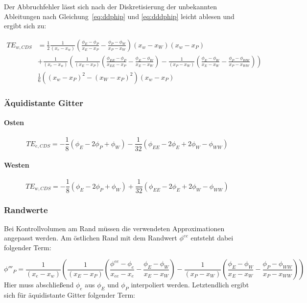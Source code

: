 \documentclass[11pt, ngerman,colorback,accentcolor=tud2d]{tudreport}
\begin{document}
Der Abbruchfehler lässt sich nach der Diskretisierung der unbekannten Ableitungen nach Gleichung~\eqref{eq:ddphip}
und \eqref{eq:dddphip} leicht ablesen und ergibt sich zu:

\begin{align}
  TE_{w, CDS} &=  \frac{1}{2} \frac{1}{(x_e-x_w)} \left({\frac{\phi_E-\phi_P}{x_E-x_P}
  - \frac{\phi_P-\phi_W}{x_P-x_W} }\right) \left({x_w-x_W}\right)(x_w-x_P)  \nonumber\\
  &+ \frac{1}{(x_e-x_w)} \left({
  \frac{1}{(x_E-x_P)} \left({\frac{\phi_{EE}-\phi_P}{x_{EE}-x_P}- \frac{\phi_E-\phi_W}{x_E-x_W} }\right)-
  \frac{1}{(x_P-x_W)} \left({\frac{\phi_E-\phi_W}{x_E-x_W} - \frac{\phi_P-\phi_{WW}}{x_P-x_{WW}} }\right)
  }\right) \nonumber\\
  &\frac{1}{6}  \left({(x_w-x_P)^2-(x_W-x_P)^2}\right)(x_w-x_P)
\end{align}

\subsubsection{Äquidistante Gitter}

\paragraph{Osten}

\begin{equation}
  TE_{e, CDS} = -\frac{1}{8} (\phi_E-2\phi_P+\phi_W) - \frac{1}{32}
  (\phi_{EE} - 2\phi_E + 2\phi_W - \phi_{WW})
\end{equation}

\paragraph{Westen}

\begin{equation}
  TE_{w, CDS} = -\frac{1}{8} (\phi_E-2\phi_P+\phi_W) + \frac{1}{32}
  (\phi_{EE} - 2\phi_E + 2\phi_W - \phi_{WW})
\end{equation}

\subsubsection{Randwerte}

Bei Kontrollvolumen am Rand müssen die verwendeten Approximationen angepasst werden.
Am östlichen Rand mit dem Randwert $\phi^{ee}$ entsteht dabei folgender Term:

\begin{equation*}
  \phi'''_P = \frac{1}{(x_e-x_w)} \left({
      \frac{1}{(x_E-x_P)} \left({\frac{\phi^{ee}-\phi_e}{x_{ee}-x_e}- \frac{\phi_E-\phi_W}{x_E-x_W} }\right)-
  \frac{1}{(x_P-x_W)} \left({\frac{\phi_E-\phi_W}{x_E-x_W} - \frac{\phi_P-\phi_{WW}}{x_P-x_{WW}} }\right)
  }\right)
\end{equation*}
Hier muss abschließend $\phi_e$ aus $\phi_E$ und $\phi_P$ interpoliert werden. Letztendlich ergibt
sich für äquidistante Gitter folgender Term:
\end{document}
